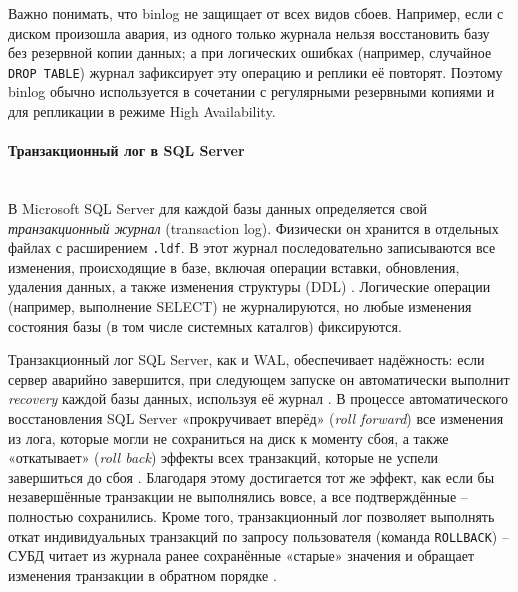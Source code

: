  Важно понимать, что binlog не защищает от всех видов сбоев. Например, если с диском произошла авария, из одного только журнала нельзя восстановить базу без резервной копии данных; а при логических ошибках (например, случайное \texttt{DROP TABLE}) журнал зафиксирует эту операцию и реплики её повторят. Поэтому binlog обычно используется в сочетании с регулярными резервными копиями и для репликации в режиме High Availability.

 \paragraph{Транзакционный лог в SQL Server} ~\\

 В Microsoft SQL Server для каждой базы данных определяется свой \textit{транзакционный журнал} (transaction log). Физически он хранится в отдельных файлах с расширением \texttt{.ldf}. В этот журнал последовательно записываются все изменения, происходящие в базе, включая операции вставки, обновления, удаления данных, а также изменения структуры (DDL) \autocite{MicrosoftLearnSQLserverTransLog}. Логические операции (например, выполнение SELECT) не журналируются, но любые изменения состояния базы (в том числе системных каталгов) фиксируются. 
 
 Транзакционный лог SQL Server, как и WAL, обеспечивает надёжность: если сервер аварийно завершится, при следующем запуске он автоматически выполнит \textit{recovery} каждой базы данных, используя её журнал \autocite{MicrosoftLearnSQLserverTransLog}. В процессе автоматического восстановления SQL Server «прокручивает вперёд» (\textit{roll forward}) все изменения из лога, которые могли не сохраниться на диск к моменту сбоя, а также «откатывает» (\textit{roll back}) эффекты всех транзакций, которые не успели завершиться до сбоя \autocite{MicrosoftLearnSQLserverTransLog}. Благодаря этому достигается тот же эффект, как если бы незавершённые транзакции не выполнялись вовсе, а все подтверждённые – полностью сохранились. Кроме того, транзакционный лог позволяет выполнять откат индивидуальных транзакций по запросу пользователя (команда \texttt{ROLLBACK}) – СУБД читает из журнала ранее сохранённые «старые» значения и обращает изменения транзакции в обратном порядке \autocite{MicrosoftLearnSQLserverTransLog}. 
 
